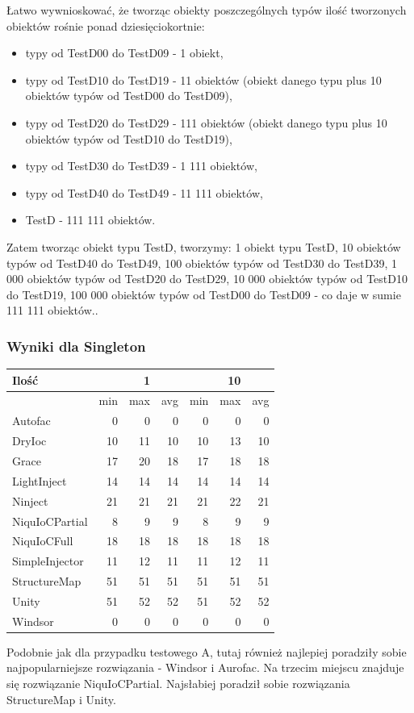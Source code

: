 \documentclass[12pt]{article}
\begin{document}
Łatwo wywnioskować, że tworząc obiekty poszczególnych typów ilość tworzonych obiektów rośnie ponad dziesięciokortnie:
\begin{itemize}
	\item typy od TestD00 do TestD09 - 1 obiekt,
	\item typy od TestD10 do TestD19 - 11 obiektów (obiekt danego typu plus 10 obiektów typów od TestD00 do TestD09),
	\item typy od TestD20 do TestD29 - 111 obiektów (obiekt danego typu plus 10 obiektów typów od TestD10 do TestD19),
	\item typy od TestD30 do TestD39 - 1 111 obiektów,
	\item  typy od TestD40 do TestD49 - 11 111 obiektów,
	\item TestD - 111 111 obiektów.
\end{itemize}
Zatem tworząc obiekt typu TestD, tworzymy: 1 obiekt typu TestD, 10 obiektów typów od TestD40 do TestD49, 100 obiektów typów od TestD30 do TestD39, 1 000 obiektów typów od TestD20 do TestD29, 10 000 obiektów typów od TestD10 do TestD19, 100 000 obiektów typów od TestD00 do TestD09 - co daje w sumie 111 111 obiektów..

\subsubsection{Wyniki dla Singleton}
\begin{center}
\begin{small}
	\begin{tabular}{ | l | r r r | r r r | }
    		\hline
     		Ilość & & 1 & & & 10 &  \\ \hline
     		 & min & max & avg & min & max & avg \\ \hline
		Autofac & 0 & 0 & 0 & 0 & 0 & 0 \\ \hline
		DryIoc & 10 & 11 & 10 & 10 & 13 & 10 \\ \hline
		Grace & 17 & 20 & 18 & 17 & 18 & 18 \\ \hline
		LightInject & 14 & 14 & 14 & 14 & 14 & 14 \\ \hline
		Ninject & 21 & 21 & 21 & 21 & 22 & 21 \\ \hline
		NiquIoCPartial & 8 & 9 & 9 & 8 & 9 & 9 \\ \hline
		NiquIoCFull & 18 & 18 & 18 & 18 & 18 & 18 \\ \hline
		SimpleInjector & 11 & 12 & 11 & 11 & 12 & 11 \\ \hline
		StructureMap & 51 & 51 & 51 & 51 & 51 & 51 \\ \hline
		Unity & 51 & 52 & 52 & 51 & 52 & 52 \\ \hline
		Windsor & 0 & 0 & 0 & 0 & 0 & 0 \\
    		\hline
  	\end{tabular}
\end{small}
\end{center}
Podobnie jak dla przypadku testowego A, tutaj również najlepiej poradziły sobie najpopularniejsze rozwiązania - Windsor i Aurofac. Na trzecim miejscu znajduje się rozwiązanie NiquIoCPartial. Najsłabiej poradził sobie rozwiązania StructureMap i Unity.
\end{document}
